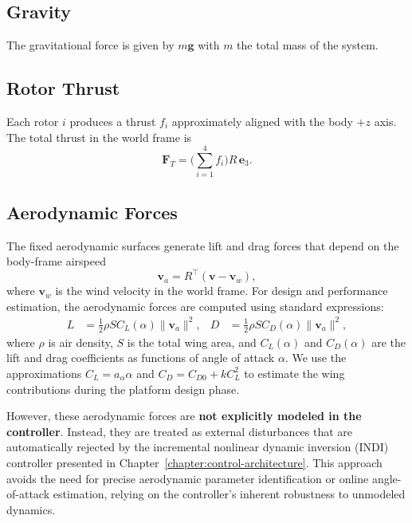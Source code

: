 \subsection{Gravity}
The gravitational force is given by $m\mathbf{g}$ with $m$ the total mass of the system.

\subsection{Rotor Thrust}
Each rotor $i$ produces a thrust $f_i$ approximately aligned with the body $+z$ axis.  
The total thrust in the world frame is
\begin{equation}
\mathbf{F}_T = \bigg(\sum_{i=1}^{4} f_i\bigg) R\,\mathbf{e}_3.
\end{equation}

\subsection{Aerodynamic Forces}
The fixed aerodynamic surfaces generate lift and drag forces that depend on the body-frame airspeed
\begin{equation}
\mathbf{v}_a = R^\top(\mathbf{v} - \mathbf{v}_w),
\end{equation}
where $\mathbf{v}_w$ is the wind velocity in the world frame.  
For design and performance estimation, the aerodynamic forces are computed using standard expressions:
\begin{align}
L &= \tfrac{1}{2}\rho S C_L(\alpha) \|\mathbf{v}_a\|^2, & D &= \tfrac{1}{2}\rho S C_D(\alpha) \|\mathbf{v}_a\|^2,
\end{align}
where $\rho$ is air density, $S$ is the total wing area, and $C_L(\alpha)$ and $C_D(\alpha)$ are the lift and drag coefficients as functions of angle of attack $\alpha$.
We use the approximations $C_L = a_\alpha \alpha$ and $C_D = C_{D0} + k C_L^2$ to estimate the wing contributions during the platform design phase.

However, these aerodynamic forces are \textbf{not explicitly modeled in the controller}.
Instead, they are treated as external disturbances that are automatically rejected by the incremental nonlinear dynamic inversion (INDI) controller presented in Chapter~\ref{chapter:control-architecture}.
This approach avoids the need for precise aerodynamic parameter identification or online angle-of-attack estimation, relying on the controller's inherent robustness to unmodeled dynamics.

